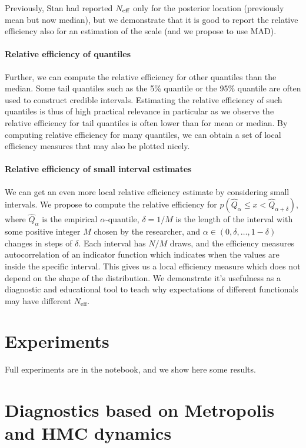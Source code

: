 \documentclass[11pt]{article}
\begin{document}
Previously, Stan had reported $N_{\rm eff}$ only for the posterior
location (previously mean but now median), but we demonstrate that it is 
good to report the relative efficiency also for an estimation of the
scale (and we propose to use MAD).

\paragraph{Relative efficiency of quantiles}

Further, we can compute the relative efficiency for other quantiles than the 
median. Some tail quantiles such as the 5\% quantile or the 95\% quantile
are often used to construct credible intervals. Estimating the relative
efficiency of such quantiles is thus of high practical relevance in particular
as we observe the relative efficiency for tail quantiles is often
lower than for mean or median. By computing relative efficiency for many quantiles,
we can obtain a set of local efficiency measures that may also be plotted nicely.

\paragraph{Relative efficiency of small interval estimates}

We can get an even more local relative efficiency estimate by considering small
intervals. We propose to compute the relative efficiency for $p(\hat{Q}_\alpha
\le x < \hat{Q}_{\alpha+\delta})$, where $\hat{Q}_\alpha$ is the empirical
$\alpha$-quantile, $\delta=1/M$ is the length of the interval with some
positive integer $M$ chosen by the researcher, and 
$\alpha \in (0,\delta,\ldots,1-\delta)$ changes in steps of $\delta$. 
Each interval has $N/M$ draws, and the efficiency measures 
autocorrelation of an indicator function which
indicates when the values are inside the specific interval. This gives
us a local efficiency measure which does not depend on the shape of the
distribution. We demonstrate it's usefulness as a diagnostic and
educational tool to teach why expectations of different
functionals may have different $N_{\mbox{eff}}$.

\section{Experiments}

Full experiments are in the notebook, and we show here some results.

\section{Diagnostics based on Metropolis and HMC dynamics}
\end{document}
